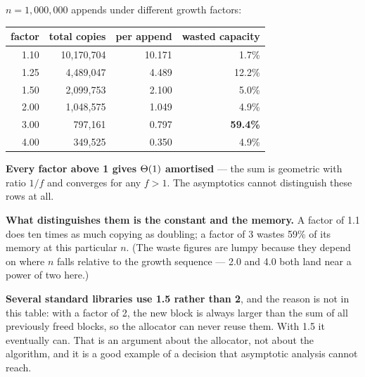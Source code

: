 \begin{worked}
$n = 1{,}000{,}000$ appends under different growth factors:

\begin{center}
\begin{tabular}{@{}rrrr@{}}
\toprule
\rowcolor{primary!15}
factor & total copies & per append & wasted capacity \\
\midrule
1.10 & 10{,}170{,}704 & 10.171 &  1.7\% \\
1.25 &  4{,}489{,}047 &  4.489 & 12.2\% \\
1.50 &  2{,}099{,}753 &  2.100 &  5.0\% \\
2.00 &  1{,}048{,}575 &  1.049 &  4.9\% \\
3.00 &    797{,}161 &  0.797 & \textbf{59.4\%} \\
4.00 &    349{,}525 &  0.350 &  4.9\% \\
\bottomrule
\end{tabular}
\end{center}

\smallskip
\textbf{Every factor above 1 gives $\Theta(1)$ amortised} --- the sum is
geometric with ratio $1/f$ and converges for any $f > 1$. The asymptotics
cannot distinguish these rows at all.

\smallskip
\textbf{What distinguishes them is the constant and the memory.} A factor of
1.1 does ten times as much copying as doubling; a factor of 3 wastes 59\% of
its memory at this particular $n$. (The waste figures are lumpy because they
depend on where $n$ falls relative to the growth sequence --- 2.0 and 4.0 both
land near a power of two here.)

\smallskip
\textbf{Several standard libraries use 1.5 rather than 2}, and the reason is
not in this table: with a factor of 2, the new block is always larger than the
sum of all previously freed blocks, so the allocator can never reuse them. With
1.5 it eventually can. That is an argument about the allocator, not about the
algorithm, and it is a good example of a decision that asymptotic analysis
cannot reach.
\end{worked}


